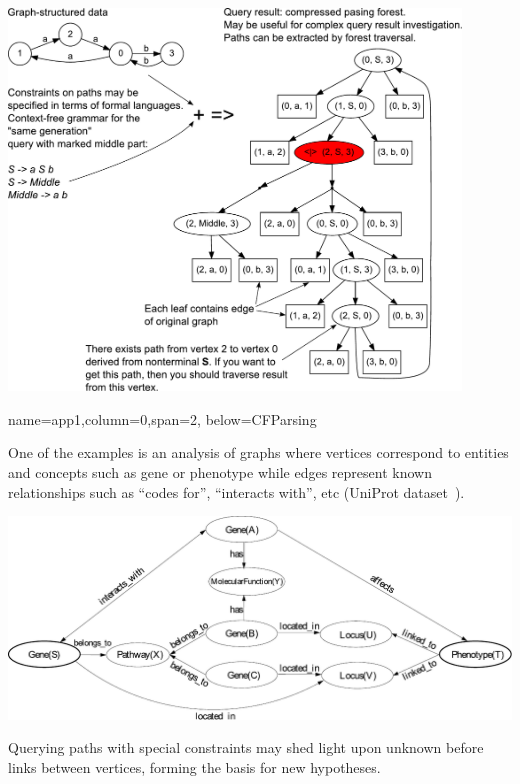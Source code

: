 \documentclass[a0paper,portrait]{baposter}
\begin{document}
\begin{poster}
{\begin{center}
\includegraphics[width=0.9\textwidth]{AnBn_r.pdf}
\end{center}
}

{name=app1,column=0,span=2, below=CFParsing}
{ %
One of the examples is an analysis of graphs where vertices correspond to entities and concepts such as gene or phenotype while edges represent known relationships such as ``codes for'', ``interacts with'', etc (UniProt dataset~\cite{UniProt}).
\begin{center}
\includegraphics[width=\textwidth]{gsd.pdf}
\end{center}
Querying paths with special constraints may shed light upon unknown before links between vertices, forming the basis for new hypotheses.
}



\end{poster}
\end{document}
